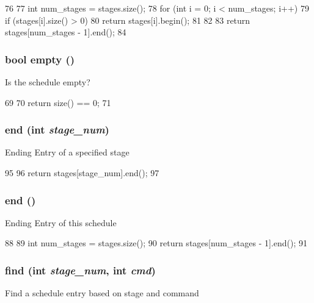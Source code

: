 \begin{DoxyCode}
76 {
77     int num_stages = stages.size();
78     for (int i = 0; i < num_stages; i++) {
79         if (stages[i].size() > 0)
80             return stages[i].begin();
81     }
82 
83     return stages[num_stages - 1].end();
84 }
\end{DoxyCode}
\hypertarget{classResourceSked_a3f37b042a1e7cd4bd38fc564de81f0da}{
\subsubsection[{empty}]{\setlength{\rightskip}{0pt plus 5cm}bool empty ()}}
\label{classResourceSked_a3f37b042a1e7cd4bd38fc564de81f0da}
Is the schedule empty? 


\begin{DoxyCode}
69 {
70     return size() == 0;
71 }
\end{DoxyCode}
\hypertarget{classResourceSked_aaf76f72bed236e2d9f89259942adba23}{
\subsubsection[{end}]{ end (int {\em stage\_\-num})}}
\label{classResourceSked_aaf76f72bed236e2d9f89259942adba23}
Ending Entry of a specified stage 


\begin{DoxyCode}
95 {
96     return stages[stage_num].end();
97 }
\end{DoxyCode}
\hypertarget{classResourceSked_a4143a7b8e61054ec5afbaf95b11997a3}{
\subsubsection[{end}]{ end ()}}
\label{classResourceSked_a4143a7b8e61054ec5afbaf95b11997a3}
Ending Entry of this schedule 


\begin{DoxyCode}
88 {
89     int num_stages = stages.size();
90     return stages[num_stages - 1].end();
91 }
\end{DoxyCode}
\hypertarget{classResourceSked_aa24faf36fbcfdcc28b6d24a25ba50427}{
\subsubsection[{find}]{ find (int {\em stage\_\-num}, \/  int {\em cmd})}}
\label{classResourceSked_aa24faf36fbcfdcc28b6d24a25ba50427}
Find a schedule entry based on stage and command 


